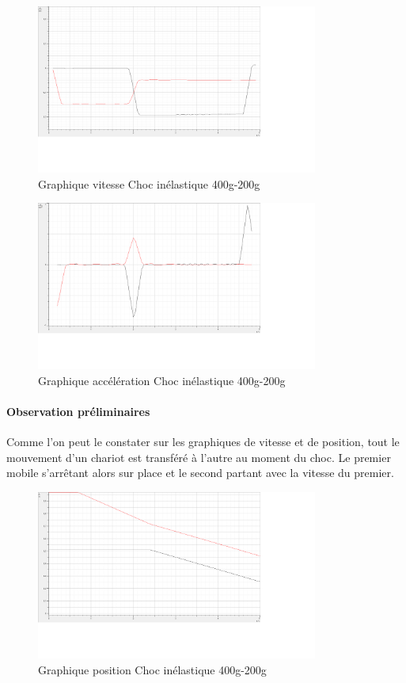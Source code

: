 \begin{figure}[h]
    \caption[Graphique vitesse Choc inélastique 400g-200g]{Graphique vitesse Choc inélastique 400g-200g}
    \centering
    \includegraphics[height=15em]{Data/400-200ela02v.png}
\end{figure}

\begin{figure}[h]
    \caption[Graphique accélération Choc inélastique 400g-200g]{Graphique accélération Choc inélastique 400g-200g}
    \centering
    \includegraphics[height=15em]{Data/400-200ela02a.png}
\end{figure}

\paragraph{Observation préliminaires}

Comme l'on peut le constater sur les graphiques de vitesse et de position, tout le mouvement d'un chariot est transféré à l'autre au moment du choc. Le premier mobile s'arrêtant alors sur place et le second partant avec la vitesse du premier.

\begin{figure}[h]
    \caption[Graphique position Choc inélastique 400g-200g]{Graphique position Choc inélastique 400g-200g}
    \centering
    \includegraphics[height=15em]{Data/400-200inela01.png}
\end{figure}


